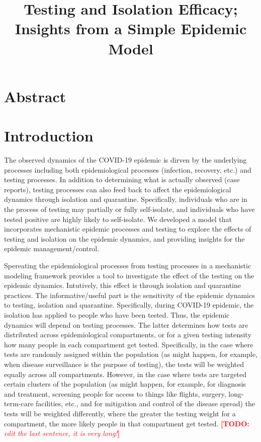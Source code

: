 \documentclass[12pt]{article}
\title{Testing and Isolation Efficacy; Insights from a Simple Epidemic Model }
\newcommand{\comment}{\showcomment}
\newcommand{\showcomment}[3]{\textcolor{#1}{\textbf{[#2: }\textsl{#3}\textbf{]}}}
\newcommand{\todo}[1]{\comment{red}{TODO}{#1}}
\theoremstyle{definition} %
\begin{document}
\maketitle

\section{Abstract}

\section{Introduction}

The observed dynamics of the COVID-19 epidemic is dirven by the underlying processes including both epidemiological processes (infection, recovery, etc.) and testing processes. In addition to determining what is actually observed (case reports), testing processes can also feed back to affect the epidemiological dynamics through isolation and quarantine. Specifically, individuals who are in the process of testing may partially or fully self-isolate, and individuals who have tested positive are highly likely to self-isolate. We developed a model that incorporates mechanistic epidemic processes and testing to explore the effects of testing and isolation on the epidemic dynamics, and providing insights for the epidemic management/control.

Spereating the epidemiological processes from testing processes in a mechanistic modeling framework provides a tool to investigate the effect of the testing on the epidemic dynamics. Intutively, this effect is through isolation and quarantine practices. The informative/useful part is the sensitivity of the epidemic dynamics to testing, isolation and quarantine. Specifically, during COVID-19 epidemic, the isolation has applied to people who have been tested. Thus, the epidemic dynamics will depend on testing processes. The latter determines how tests are distributed across epidemiological compartments, or for a given testing intensity how many people in each compartment get tested. Specifically, in the case where tests are randomly assigned within the population (as might happen, for example, when disease surveillance is the purpose of testing), the tests will be weighted equally across all compartments. However, in the case where tests are targeted certain clusters of the population (as might happen, for example, for diagnosis and treatment, screening people for access to things like flights, surgery, long-term-care facilities, etc., and for mitigation and control of the disease spread) the tests will be weighted differently, where the greater the testing weight for a compartment, the more likely people in that compartment get tested. \todo{edit the last sentence, it is very long!}
\end{document}
